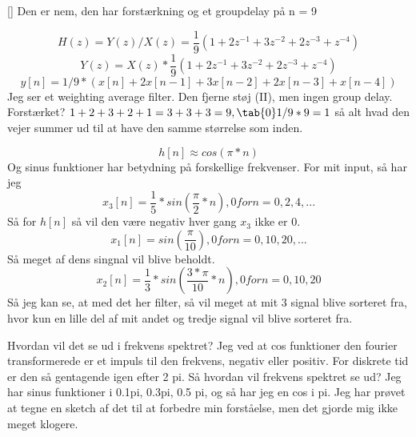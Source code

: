 \begin{Opgaver}
\begin{kapitel}
\begin{Opgave}
\begin{UnderOpgave}[\text{h[n] = [1,-2,3,—4,0,4, —3,2, -1]}]
            \end{UnderOpgave}[]
                Den er nem, den har forstærkning og et groupdelay på n = 9
            \begin{UnderOpgave}[\text{$H(z) = \frac{1}{9}(1 + 2z^{-1} + 3z^{-2} + 2z^{-3} + z^{-4})$}]
                \[H(z) = Y(z)/X(z) = \frac{1}{9}(1 + 2z^{-1} + 3z^{-2} + 2z^{-3} + z^{-4})\]
                \[Y(z) = X(z) * \frac{1}{9}(1 + 2z^{-1} + 3z^{-2} + 2z^{-3} + z^{-4})\]
                \[y[n] = 1/9 *(x[n] + 2x[n - 1] + 3x[n - 2] + 2x[n - 3] + x[n - 4])\]
                Jeg ser et weighting average filter. Den fjerne støj (II), men ingen group delay. 
                Forstærket? $ 1 + 2 + 3 + 2 + 1 = 3 + 3 + 3 = 9, \tab{0} 1/9 * 9 = 1$ så alt hvad den vejer summer ud til at have den samme størrelse som inden. 

            \end{UnderOpgave}

            \begin{UnderOpgave}[\text{$h[n] = {1, -1.1756, 1}$}]
                \[h[n] \approx cos(\pi * n)\]
                Og sinus funktioner har betydning på forskellige frekvenser.
                For mit input, så har jeg
                \[x_3[n] = \frac{1}{5} * sin(\frac{\pi}{2} * n), 0 for n = 0, 2, 4, ...\]
                Så for $h[n]$ så vil den være negativ hver gang $x_3$ ikke er 0.
                \[x_1[n] = sin(\frac{\pi}{10}), 0 for n = 0, 10, 20, ...\]
                Så meget af dens singnal vil blive beholdt. 
                \[x_2[n] = \frac{1}{3} * sin(\frac{3 * \pi}{10} * n), 0 for n = 0, 10, 20\]
                Så jeg kan se, at med det her filter, så vil meget at mit 3 signal blive sorteret fra, hvor kun en lille del af mit andet og tredje signal vil blive sorteret fra. 
                
                Hvordan vil det se ud i frekvens spektret? 
                Jeg ved at cos funktioner den fourier transformerede er et impuls til den frekvens, negativ eller positiv. For diskrete tid er den så gentagende igen efter 2 pi.
                Så hvordan vil frekvens spektret se ud? Jeg har sinus funktioner i 0.1pi, 0.3pi, 0.5 pi, og så har jeg en cos i pi. 
                Jeg har prøvet at tegne en sketch af det til at forbedre min forståelse, men det gjorde mig ikke meget klogere. 
            \end{UnderOpgave}


\end{Opgave}
\end{kapitel}
\end{Opgaver}
